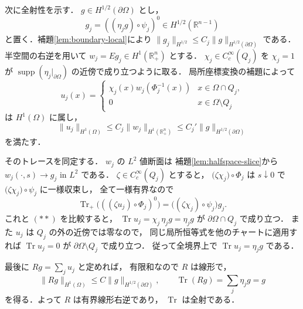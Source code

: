 \documentclass[a5paper,10pt,onecolumn]{jsarticle}
\makeatletter
\theoremstyle{mathnotetheorem}
\renewcommand{\proofname}{証明}
\renewenvironment{proof}[1][\proofname]{%
  \par\pushQED{\qed}\normalfont\topsep4\p@\@plus2\p@\relax
  \trivlist\item[\hskip\labelsep\bfseries #1]\ignorespaces
}{\popQED\endtrivlist\@endpefalse}
\newcommand{\norm}[1]{\lVert #1\rVert}
\makeatother
\begin{document}
\begin{proof}
次に全射性を示す．
$g\in H^{1/2}(\partial\Omega)$ とし，
\[
 g_j=((\eta_jg)\circ\psi_j)^0
 \in H^{1/2}(\mathbb R^{n-1})
\]
と置く．補題\ref{lem:boundary-local}により
$\norm{g_j}_{H^{1/2}}\le C_j\norm g_{H^{1/2}(\partial\Omega)}$
である．半空間の右逆を用いて
$w_j=Eg_j\in H^1(\mathbb R^n_+)$ とする．
$\chi_j\in C_c^\infty(Q_j)$ を
$\chi_j=1$ が
$\operatorname{supp}(\eta_j|_{\partial\Omega})$
の近傍で成り立つように取る．
局所座標変換の補題によって
\[
 u_j(x)=
 \begin{cases}
 \chi_j(x)w_j(\Phi_j^{-1}(x))
       &x\in\Omega\cap Q_j,\\
 0     &x\in\Omega\setminus Q_j
 \end{cases}
\]
は $H^1(\Omega)$ に属し，
\[
 \norm{u_j}_{H^1(\Omega)}
 \le C_j\norm{w_j}_{H^1(\mathbb R^n_+)}
 \le C_j'\norm g_{H^{1/2}(\partial\Omega)}
\]
を満たす．

そのトレースを同定する．
$w_j$ の $L^2$ 値断面は
補題\ref{lem:halfspace-slice}から
$w_j(\cdot,s)\to g_j$ in $L^2$ である．
$\zeta\in C_c^\infty(Q_j)$ とすると，
$\bigl(\zeta\chi_j\bigr)\circ\Phi_j$ は
$s\downarrow0$ で
$\bigl(\zeta\chi_j\bigr)\circ\psi_j$ に一様収束し，
全て一様有界なので
\[
 \operatorname{Tr}_+
  \bigl(((\zeta u_j)\circ\Phi_j)^0\bigr)
 =\bigl((\zeta\chi_j)\circ\psi_j\bigr)g_j.
\]
これと $(**)$ を比較すると，
$\operatorname{Tr}u_j=\chi_j\,\eta_jg
=\eta_jg$ が $\partial\Omega\cap Q_j$ で成り立つ．
また $u_j$ は $Q_j$ の外の近傍では零なので，
同じ局所恒等式を他のチャートに適用すれば
$\operatorname{Tr}u_j=0$ が
$\partial\Omega\setminus Q_j$ で成り立つ．
従って全境界上で
$\operatorname{Tr}u_j=\eta_jg$ である．

最後に $Rg=\sum_j u_j$ と定めれば，
有限和なので $R$ は線形で，
\[
 \norm{Rg}_{H^1(\Omega)}
 \le C\norm g_{H^{1/2}(\partial\Omega)},\qquad
 \operatorname{Tr}(Rg)=\sum_j\eta_jg=g
\]
を得る．よって $R$ は有界線形右逆であり，
$\operatorname{Tr}$ は全射である．
\end{proof}
\end{document}
